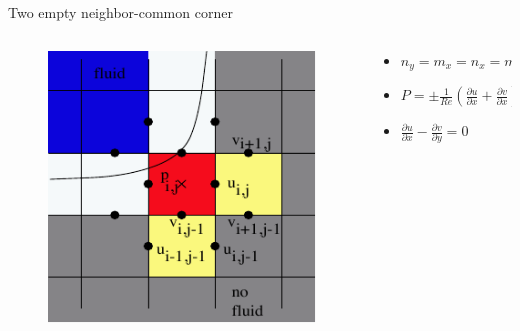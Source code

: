 \documentclass{beamer}
\begin{document}
	\begin{frame}{Two empty neighbor-common corner}
	    \begin{columns}
	 		\begin{column}[c]{0.4\textwidth}
		 		\begin{figure}
					\includegraphics[width=1\textwidth]{pic/two1.pdf}
		 		\end{figure}
			\end{column}
			\begin{column}[c]{0.6\textwidth}
				\begin{itemize}
					\item $ n_y = m_x=n_x = m_y  $
					\item $ P=\pm \frac{1}{Re}\left( \frac{\partial u}{\partial x}+  \frac{\partial v}{\partial x} \right) $
					\item $ \frac{\partial u}{\partial x}- \frac{\partial v}{\partial y}=0 $
				\end{itemize}
			\end{column}
		\end{columns}		
	\end{frame}	
	
\end{document}
